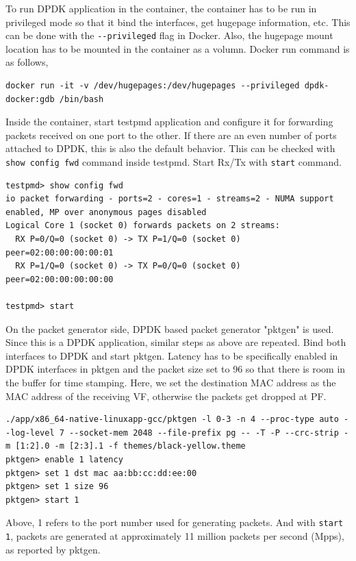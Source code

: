 \documentclass[english, 12pt, a4paper, elec, utf8, a-1b, online]{aaltothesis}
\begin{document}
To run DPDK application in the container, the container has to be run in privileged mode so that it bind the interfaces, get hugepage information, etc. This can be done with the \lstinline{--privileged} flag in Docker. Also, the hugepage mount location has to be mounted in the container as a volumn. Docker run command is as follows,
\begin{lstlisting}[basicstyle={\small\ttfamily}]
docker run -it -v /dev/hugepages:/dev/hugepages --privileged dpdk-docker:gdb /bin/bash
\end{lstlisting}

Inside the container, start testpmd application and configure it for forwarding packets received on one port to the other. If there are an even number of ports attached to DPDK, this is also the default behavior. This can be checked with \lstinline{show config fwd} command inside testpmd. Start Rx/Tx with \lstinline{start} command.

\begin{lstlisting}[basicstyle={\small\ttfamily}]
testpmd> show config fwd
io packet forwarding - ports=2 - cores=1 - streams=2 - NUMA support enabled, MP over anonymous pages disabled
Logical Core 1 (socket 0) forwards packets on 2 streams:
  RX P=0/Q=0 (socket 0) -> TX P=1/Q=0 (socket 0) peer=02:00:00:00:00:01
  RX P=1/Q=0 (socket 0) -> TX P=0/Q=0 (socket 0) peer=02:00:00:00:00:00

testpmd> start
\end{lstlisting}

On the packet generator side, DPDK based packet generator "pktgen" is used. Since this is a DPDK application, similar steps as above are repeated. Bind both interfaces to DPDK and start pktgen.
Latency has to be specifically enabled in DPDK interfaces in pktgen and the packet size set to 96 so that there is room in the buffer for time stamping. Here, we set the destination MAC address as the MAC address of the receiving VF, otherwise the packets get dropped at PF.

\begin{lstlisting}[basicstyle={\small\ttfamily}]
./app/x86_64-native-linuxapp-gcc/pktgen -l 0-3 -n 4 --proc-type auto --log-level 7 --socket-mem 2048 --file-prefix pg -- -T -P --crc-strip -m [1:2].0 -m [2:3].1 -f themes/black-yellow.theme
pktgen> enable 1 latency
pktgen> set 1 dst mac aa:bb:cc:dd:ee:00
pktgen> set 1 size 96
pktgen> start 1
\end{lstlisting}
Above, 1 refers to the port number used for generating packets. And with \lstinline{start 1}, packets are generated at approximately 11 million packets per second (Mpps), as reported by pktgen.
\end{document}
